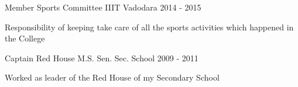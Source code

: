 \begin{cventries}
\cventry
    {Member}
    {Sports Committee}
    {IIIT Vadodara}
    {2014 - 2015}
    {
      \begin{cvitems}
        \item {Responsibility of keeping take care of all the sports activities which happened in the College}
      \end{cvitems}
    }
\cventry
    {Captain}
    {Red House}
    {M.S. Sen. Sec. School }
    {2009 - 2011}
    {
      \begin{cvitems}
        \item {Worked as leader of the Red House of my Secondary School}
      \end{cvitems}
    }
\end{cventries}

